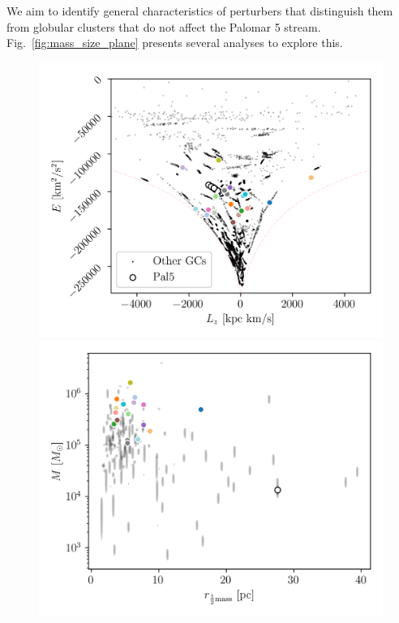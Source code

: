 \documentclass{aa}
\begin{document}
    We aim to identify general characteristics of perturbers that distinguish them from globular clusters that do not affect the Palomar 5 stream. Fig.~\ref{fig:mass_size_plane} presents several analyses to explore this.

    
    \begin{figure}
      \centering
      \includegraphics[width=0.45\linewidth]{E_Lz_perturbers.png}
      \includegraphics[width=0.45\linewidth]{mass_size_plane.png}


\end{figure}
\end{document}
